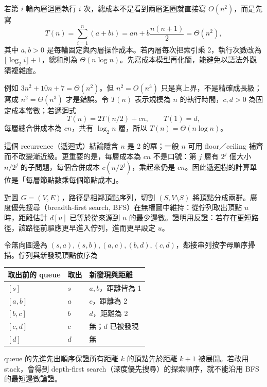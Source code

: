 \documentclass[11pt,a4paper,oneside,openany]{book}
\begin{document}
\begin{example}[從程式結構得到求和式]
若第 $i$ 輪內層迴圈執行 $i$ 次，總成本不是看到兩層迴圈就直接寫 $O(n^2)$，而是先寫
\[
 T(n)=\sum_{i=1}^{n}(a+bi)=an+b\frac{n(n+1)}2=\Theta(n^2),
\]
其中 $a,b>0$ 是每輪固定與內層操作成本。若內層每次把索引乘 2，執行次數改為 $\lfloor\log_2 i\rfloor+1$，總和則為 $\Theta(n\log n)$。先寫成本模型再化簡，能避免以語法外觀猜複雜度。
\end{example}
例如 $3n^2+10n+7=\Theta(n^2)$。但 $n^2=O(n^3)$ 只是真上界，不是精確成長級；寫成 $n^2=\Theta(n^3)$ 才是錯誤。令 $T(n)$ 表示規模為 $n$ 的執行時間，$c,d>0$ 為固定成本常數；若遞迴式
\[
 T(n)=2T(n/2)+cn,\qquad T(1)=d,
\]
每層總合併成本為 $cn$，共有 $\log_2 n$ 層，所以 $T(n)=\Theta(n\log n)$。

這個 recurrence（遞迴式）結論隱含 $n$ 是 2 的冪；一般 $n$ 可用 floor／ceiling 補齊而不改變漸近級。更重要的是，每層成本為 $cn$ 不是口號：第 $j$ 層有 $2^j$ 個大小 $n/2^j$ 的子問題，每個合併成本 $c(n/2^j)$，乘起來仍是 $cn$。因此遞迴樹的計算單位是「每層節點數乘每個節點成本」。

對圖 $G=(V,E)$，路徑是相鄰頂點序列，切割 $(S,V\setminus S)$ 將頂點分成兩群。廣度優先搜尋（breadth-first search, BFS）在無權圖中維持：從佇列取出頂點 $u$ 時，距離估計 $d[u]$ 已等於從來源到 $u$ 的最少邊數。證明用反證：若存在更短路徑，該路徑前驅應更早進入佇列，進而更早設定 $u$。

\begin{example}
令無向圖邊為 $(s,a),(s,b),(a,c),(b,d),(c,d)$，鄰接串列按字母順序掃描。佇列與新發現頂點依序為
\begin{center}
\begin{tabular}{@{}lll@{}}
\toprule
取出前的 queue & 取出 & 新發現與距離 \\
\midrule
$[s]$ & $s$ & $a,b$，距離皆為 1 \\
$[a,b]$ & $a$ & $c$，距離為 2 \\
$[b,c]$ & $b$ & $d$，距離為 2 \\
$[c,d]$ & $c$ & 無；$d$ 已被發現 \\
$[d]$ & $d$ & 無 \\
\bottomrule
\end{tabular}
\end{center}
queue 的先進先出順序保證所有距離 $k$ 的頂點先於距離 $k+1$ 被展開。若改用 stack，會得到 depth-first search（深度優先搜尋）的探索順序，就不能沿用 BFS 的最短邊數論證。
\end{example}
\end{document}
